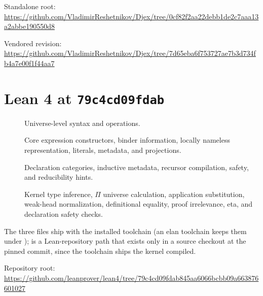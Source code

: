 \documentclass[10pt,letterpaper,oneside,openany]{report}
\newcommand{\LeanCommit}{\texttt{79c4cd09fdab}}
\begin{document}
Standalone root: \url{https://github.com/VladimirReshetnikov/Djex/tree/0cf82f2aa22debb1de2c7aaa13a2abbe190550d8}

Vendored revision: \url{https://github.com/VladimirReshetnikov/Djex/tree/7d65eba6f753727ae7b3d734fb4a7e00f1f44aa7}

\section{Lean 4 at \LeanCommit}

\begin{description}
\item[] Universe-level syntax and operations.
\item[] Core expression constructors, binder information, locally nameless representation, literals, metadata, and projections.
\item[] Declaration categories, inductive metadata, recursor compilation, safety, and reducibility hints.
\item[] Kernel type inference, $\Pi$ universe calculation, application substitution, weak-head normalization, definitional equality, proof irrelevance, eta, and declaration safety checks.
\end{description}

The three  files ship with the installed toolchain (an elan toolchain keeps them under );  is a Lean-repository path that exists only in a source checkout at the pinned commit, since the toolchain ships the kernel compiled.

Repository root: \url{https://github.com/leanprover/lean4/tree/79c4cd09fdab845aa6066bcbb09a663876601027}
\end{document}
